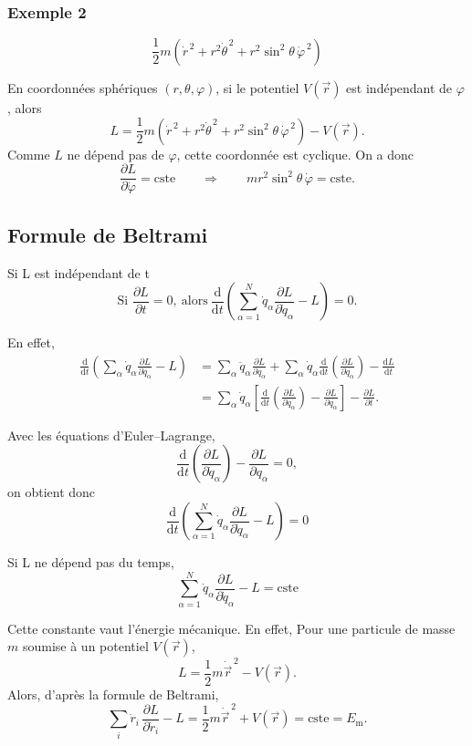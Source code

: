 \documentclass[french]{yLectureNote}
\renewcommand{\vec}{\overrightarrow}
\newcommand{\dd}{\mathrm{d}}
\begin{document}
\subsubsection{Exemple 2}
\begin{theorem}
    $$\frac{1}{2}m\left(\dot{r}^{\,2}+r^{2}\dot{\theta}^{\,2}+r^{2}\sin^{2}\theta\,\dot{\varphi}^{\,2}\right)$$
\end{theorem}
En coordonnées sphériques $(r,\theta,\varphi)$, si le potentiel $V(\vec{r})$ est indépendant de $\varphi$, alors
\[
L=\frac{1}{2}m\left(\dot{r}^{\,2}+r^{2}\dot{\theta}^{\,2}+r^{2}\sin^{2}\theta\,\dot{\varphi}^{\,2}\right)-V(\vec{r}).
\]
Comme $L$ ne dépend pas de $\varphi$, cette coordonnée est cyclique. On a donc
\[
\frac{\partial L}{\partial \dot{\varphi}}=\text{cste}
\qquad \Rightarrow \qquad
mr^{2}\sin^{2}\theta\,\dot{\varphi}=\text{cste}.
\]
\subsection{Formule de Beltrami}
Si L est indépendant de t
\[
\text{Si } \frac{\partial L}{\partial t}=0,\ \text{alors}\ 
\frac{\dd}{\dd t}\!\left(\sum_{\alpha=1}^{N}\dot q_\alpha
\frac{\partial L}{\partial \dot q_\alpha}-L\right)=0.
\]

En effet,
\begin{align*}
\frac{\dd}{\dd t}\!\left(\sum_{\alpha}\dot q_\alpha\frac{\partial L}{\partial \dot q_\alpha}-L\right)
&=
\sum_{\alpha}\ddot q_\alpha\frac{\partial L}{\partial \dot q_\alpha}
+\sum_{\alpha}\dot q_\alpha\frac{\dd}{\dd t}\!\left(\frac{\partial L}{\partial \dot q_\alpha}\right)
-\frac{\dd L}{\dd t} \\
&=
\sum_{\alpha}\dot q_\alpha\left[\frac{\dd}{\dd t}\!\left(\frac{\partial L}{\partial \dot q_\alpha}\right)-\frac{\partial L}{\partial q_\alpha}\right]
-\frac{\partial L}{\partial t}.
\end{align*}

Avec les équations d'Euler--Lagrange,
\[
\frac{\dd}{\dd t}\!\left(\frac{\partial L}{\partial \dot q_\alpha}\right)-\frac{\partial L}{\partial q_\alpha}=0,
\]
on obtient donc
\[
\frac{\dd}{\dd t}\!\left(\sum_{\alpha=1}^{N}\dot q_\alpha\frac{\partial L}{\partial \dot q_\alpha}-L\right)=0
\]
\begin{theorem}
    Si L ne dépend pas du temps, 
    $$\sum_{\alpha=1}^{N}\dot q_\alpha\frac{\partial L}{\partial \dot q_\alpha}-L=\text{cste}$$
\end{theorem}
Cette constante vaut l'énergie mécanique. En effet, 
Pour une particule de masse $m$ soumise à un potentiel $V(\vec r)$,
\[
L=\frac12 m\dot{\vec r}^{\,2}-V(\vec r).
\]
Alors, d'après la formule de Beltrami,
\[
\sum_i \dot r_i\,\frac{\partial L}{\partial \dot r_i}-L
=\frac12 m\dot{\vec r}^{\,2}+V(\vec r)
=\text{cste}=E_{\mathrm m}.
\]
\end{document}
